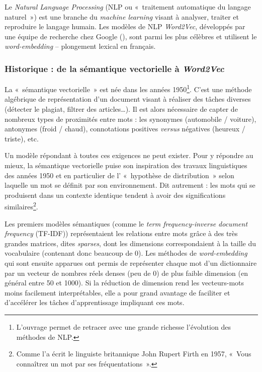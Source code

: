 \documentclass[11pt,french,french]{article}
\let\rmarkdownfootnote\footnote%
\def\footnote{\protect\rmarkdownfootnote}
\begin{document}
Le \emph{Natural Language Processing} (NLP ou «~traitement automatique
du langage naturel~») est une branche du \emph{machine learning} visant
à analyser, traiter et reproduire le langage humain. Les modèles de NLP
\emph{Word2Vec}, développés par une équipe de recherche chez Google
(\cite{Mikolov}), sont parmi les plus célèbres et utilisent le
\emph{word-embedding} -- plongement lexical en français.

\subsubsection{\texorpdfstring{Historique : de la sémantique vectorielle
à
\emph{Word2Vec}}{Historique : de la sémantique vectorielle à Word2Vec}}\label{historique-de-la-suxe9mantique-vectorielle-uxe0-word2vec}

La «~sémantique vectorielle~» est née dans les années 1950\footnote{L'ouvrage
  \cite{Jurafsky} permet de retracer avec une grande richesse
  l'évolution des méthodes de NLP.}. C'est une méthode algébrique de
représentation d'un document visant à réaliser des tâches diverses
(détecter le plagiat, filtrer des articles\dots). Il est alors
nécessaire de capter de nombreux types de proximités entre mots : les
synonymes (automobile / voiture), antonymes (froid / chaud),
connotations positives \emph{versus} négatives (heureux / triste), etc.

Un modèle répondant à toutes ces exigences ne peut exister. Pour y
répondre au mieux, la sémantique vectorielle puise son inspiration des
travaux linguistiques des années 1950 et en particulier de l'
«~hypothèse de distribution~» selon laquelle un mot se définit par son
environnement. Dit autrement : les mots qui se produisent dans un
contexte identique tendent à avoir des significations
similaires\footnote{Comme l'a écrit le linguiste britannique John Rupert
  Firth en 1957, «~Vous connaîtrez un mot par ses fréquentations~».}.

Les premiers modèles sémantiques (comme le \emph{term frequency-inverse
document frequency} (TF-IDF)) représentaient les relations entre mots
grâce à des très grandes matrices, dites \emph{sparses}, dont les
dimensions correspondaient à la taille du vocabulaire (contenant donc
beaucoup de 0). Les méthodes de \emph{word-embedding} qui sont ensuite
apparues ont permis de représenter chaque mot d'un dictionnaire par un
vecteur de nombres réels denses (peu de 0) de plus faible dimension (en
général entre 50 et 1000). Si la réduction de dimension rend les
vecteurs-mots moins facilement interprétables, elle a pour grand
avantage de faciliter et d'accélérer les tâches d'apprentissage
impliquant ces mots.
\end{document}
